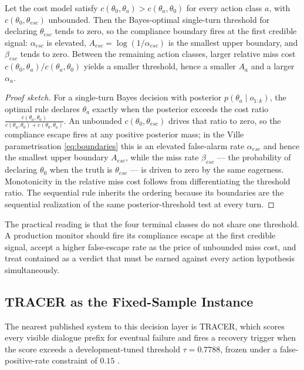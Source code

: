 \begin{proposition}
\label{prop:asymmetric}
Let the cost model satisfy $c(\theta_0, \theta_a) > c(\theta_a, \theta_0)$ for every action class $a$, with $c(\theta_0, \theta_{esc})$ unbounded.
Then the Bayes-optimal single-turn threshold for declaring $\theta_{esc}$ tends to zero, so the compliance boundary fires at the first credible signal: $\alpha_{esc}$ is elevated, $A_{esc} = \log(1/\alpha_{esc})$ is the smallest upper boundary, and $\beta_{esc}$ tends to zero.
Between the remaining action classes, larger relative miss cost $c(\theta_0, \theta_a)/c(\theta_a, \theta_0)$ yields a smaller threshold, hence a smaller $A_a$ and a larger $\alpha_a$.
\end{proposition}

\begin{proof}[Proof sketch]
For a single-turn Bayes decision with posterior $p(\theta_a \mid o_{1:k})$, the optimal rule declares $\theta_a$ exactly when the posterior exceeds the cost ratio $\frac{c(\theta_a,\theta_0)}{c(\theta_a,\theta_0) + c(\theta_0,\theta_a)}$.
An unbounded $c(\theta_0, \theta_{esc})$ drives that ratio to zero, so the compliance escape fires at any positive posterior mass; in the Ville parametrisation \eqref{eq:boundaries} this is an elevated false-alarm rate $\alpha_{esc}$ and hence the smallest upper boundary $A_{esc}$, while the miss rate $\beta_{esc}$ --- the probability of declaring $\theta_0$ when the truth is $\theta_{esc}$ --- is driven to zero by the same eagerness.
Monotonicity in the relative miss cost follows from differentiating the threshold ratio.
The sequential rule inherits the ordering because its boundaries are the sequential realization of the same posterior-threshold test at every turn.
\end{proof}

The practical reading is that the four terminal classes do not share one threshold.
A production monitor should fire its compliance escape at the first credible signal, accept a higher false-escape rate as the price of unbounded miss cost, and treat contained as a verdict that must be earned against every action hypothesis simultaneously.

\subsection{TRACER as the Fixed-Sample Instance}
\label{subsec:tracer}
The nearest published system to this decision layer is TRACER, which scores every visible dialogue prefix for eventual failure and fires a recovery trigger when the score exceeds a development-tuned threshold $\tau = 0.7788$, frozen under a false-positive-rate constraint of $0.15$ \citep{nourbakhsh2026tracer}.

